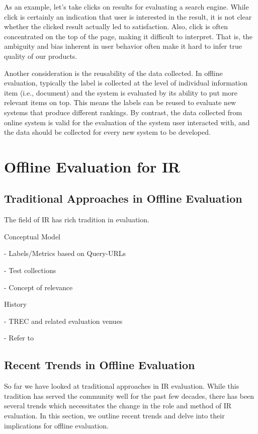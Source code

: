 \documentclass[openany]{now} %
\newcommand{\newpar}{\bigskip\noindent}
\begin{document}
As an example, let's take clicks on results for evaluating a search engine. While click is certainly an indication that user is interested in the result, it is not clear whether the clicked result actually led to satisfaction. Also, click is often concentrated on the top of the page, making it difficult to interpret. That is, the ambiguity and bias inherent in user behavior often make it hard to infer true quality of our products.

Another consideration is the reusability of the data collected. In offline evaluation, typically the label is collected at the level of individual information item (i.e., document) and the system is evaluated by its ability to put more relevant items on top. This means the labels can be reused to evaluate new systems that produce different rankings. By contrast, the data collected from online system is valid for the evaluation of the system user interacted with, and the data should be collected for every new system to be developed.

\section{Offline Evaluation for IR}

\subsection{Traditional Approaches in Offline Evaluation}

The field of IR has rich tradition in evaluation. %

Conceptual Model

- Labels/Metrics based on Query-URLs

- Test collections 

- Concept of relevance 

\newpar
History

- TREC and related evaluation venues \cite{INR-009}

- Refer to \cite{borlund2003} \cite{cleverdon67} \cite{voor:trec05}

\subsection{Recent Trends in Offline Evaluation}

So far we have looked at traditional approaches in IR evaluation. While this tradition has served the community well for the past few decades, there has been several trends which necessitates the change in the role and method of IR evaluation. In this section, we outline recent trends and delve into their implications for offline evaluation.
\end{document}
